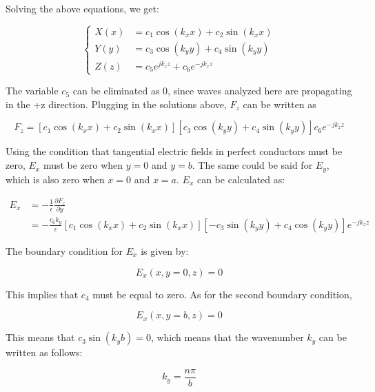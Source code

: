 \documentclass[a4paper,12pt]{report}
\begin{document}
Solving the above equations, we get:

\begin{equation} \label{eq:three_solved_ordinary}
  \left\{
  \begin{alignedat}{3}
    X(x) &= c_1 \cos (k_x x) + c_2 \sin (k_x x) \\
    Y(y) &= c_3 \cos (k_y y) + c_4 \sin (k_y y) \\
    Z(z) &= c_5 e^{j k_z z} + c_6 e^{-j k_z z}
  \end{alignedat}
  \right.
\end{equation}

The variable $c_5$ can be eliminated as $0$,
since waves analyzed here are propagating in the +z direction.
Plugging in the solutions above, $F_z$ can be written as

\begin{equation}
  F_z = [c_1 \cos (k_x x) + c_2 \sin (k_x x)][c_3 \cos (k_y y) + c_4 \sin (k_y y)]c_6 e^{-j k_z z}
\end{equation}

Using the condition that tangential electric fields in perfect conductors must be zero,
$E_x$ must be zero when $y=0$ and $y=b$.
The same could be said for $E_y$,
which is also zero when $x=0$ and $x=a$.
$E_x$ can be calculated as:

\begin{equation}
  \begin{split}
    E_x &= -\frac{1}{\epsilon} \frac{\partial F_z}{\partial y} \\
        &= - \frac{c_6 k_y}{\epsilon}[c_1 \cos (k_x x) + c_2 \sin (k_x x)][-c_3 \sin (k_y y) + c_4 \cos(k_y y)]e^{-jk_z z}
  \end{split}
\end{equation}

The boundary condition for $E_x$ is given by:

\begin{equation}
  E_x(x, y=0, z) = 0
\end{equation}

This implies that $c_4$ must be equal to zero.
As for the second boundary condition,

\begin{equation}
  E_x(x, y=b, z) = 0
\end{equation}

This means that $c_3 \sin (k_y b) = 0$, which means that the wavenumber $k_y$
can be written as follows:

\begin{equation} \label{eq:wavenumber_y}
  k_y = \frac{n\pi}{b}
\end{equation}
\end{document}
